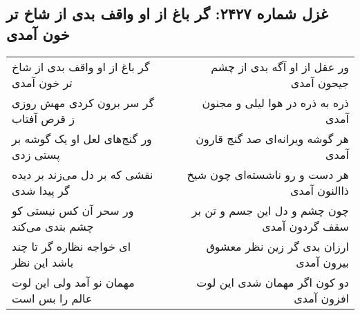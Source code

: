 \begin{center}
\section*{غزل شماره ۲۴۲۷: گر باغ از او واقف بدی از شاخ تر خون آمدی}
\label{sec:2427}
\begin{longtable}{l p{0.5cm} r}
گر باغ از او واقف بدی از شاخ تر خون آمدی
&&
ور عقل از او آگه بدی از چشم جیحون آمدی
\\
گر سر برون کردی مهش روزی ز قرص آفتاب
&&
ذره به ذره در هوا لیلی و مجنون آمدی
\\
ور گنج‌های لعل او یک گوشه بر پستی زدی
&&
هر گوشه ویرانه‌ای صد گنج قارون آمدی
\\
نقشی که بر دل می‌زند بر دیده گر پیدا شدی
&&
هر دست و رو ناشسته‌ای چون شیخ ذاالنون آمدی
\\
ور سحر آن کس نیستی کو چشم بندی می‌کند
&&
چون چشم و دل این جسم و تن بر سقف گردون آمدی
\\
ای خواجه نظاره گر تا چند باشد این نظر
&&
ارزان بدی گر زین نظر معشوق بیرون آمدی
\\
مهمان نو آمد ولی این لوت عالم را بس است
&&
دو کون اگر مهمان شدی این لوت افزون آمدی
\\
\end{longtable}
\end{center}
